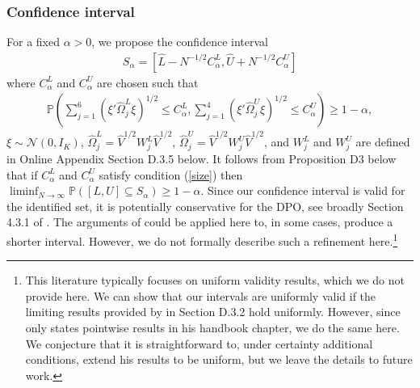 \documentclass[12pt]{article}
\theoremstyle{definition}
\begin{document}
{\subsubsection{Confidence interval}
For a fixed $\alpha > 0$, we propose the confidence interval 
\begin{align*}
S_{\alpha} = \left[\hat{L} - N^{-1/2}C^{L}_{\alpha}, \hat{U} + N^{-1/2}C^{U}_{\alpha}\right]
\end{align*}
where $C^{L}_{\alpha}$ and $C^{U}_{\alpha}$ are chosen such that 
\begin{align}\label{size}
\mathbb{P}\left(\sum_{j=1}^{6}\left(\xi ' \hat{\Omega}_j^{L} \xi\right)^{1/2} \leq C_{\alpha}^{L},\sum_{j=1}^{4}\left(\xi ' \hat{\Omega}_j^{U} \xi\right)^{1/2} \leq C_{\alpha}^{U} \right) \geq 1-\alpha,
\end{align}
 $\xi \sim \mathcal{N}\left(0,I_{K}\right)$, $\hat{\Omega}_j^L = \hat{V}^{1/2}W_{j}^L \hat{V}^{1/2}$, $\hat{\Omega}_j^U = \hat{V}^{1/2}W_{j}^U \hat{V}^{1/2}$, and $W_j^L$ and $W_j^U$ are defined in Online Appendix Section D.3.5 below. It follows from Proposition D3 below that if $C^{L}_{\alpha}$ and $C^{U}_{\alpha}$ satisfy condition (\ref{size}) then $\liminf_{N\to\infty}\mathbb{P}\left( [L,U] \subseteq S_{\alpha}\right) \geq 1-\alpha$. Since our confidence interval is valid for the identified set, it is potentially conservative for the DPO, see broadly Section 4.3.1 of \cite{molinari2020microeconometrics}. The arguments of \cite{imbens2004confidence, stoye2009more} could be applied here to, in some cases, produce a shorter interval. However, we do not formally describe such a refinement here.\footnote{This literature typically focuses on uniform validity results, which we do not provide here. We can show that our intervals are uniformly valid if the limiting results provided by \cite{graham2020network}  in Section D.3.2 hold uniformly. However, since  \cite{graham2020network} only states pointwise results in his handbook chapter, we do the same here. We conjecture that it is straightforward to, under certainty additional conditions, extend his results to be uniform, but we leave the details to future work.}   

}
\end{document}
